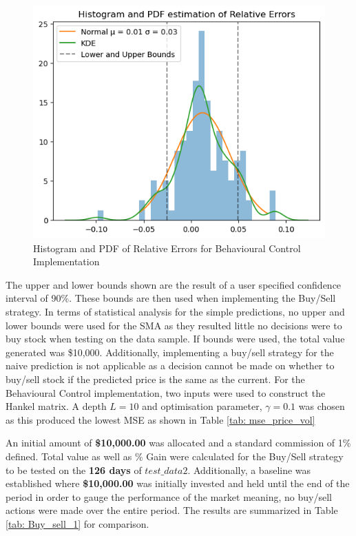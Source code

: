 \begin{figure}[h]
    \centering
    \includegraphics[width=0.8\columnwidth]{Results/Buy_sell/Behave_hist.png}
    \caption{Histogram and PDF of Relative Errors for Behavioural Control Implementation}
    \label{fig: behave_hist}
\end{figure}

\noindent The upper and lower bounds shown are the result of a user specified confidence interval of 90\%. These bounds are then used when implementing the Buy/Sell strategy. In terms of statistical analysis for the simple predictions, no upper and lower bounds were used for the SMA as they resulted little no decisions were to buy stock when testing on the data sample. If bounds were used, the total value generated was \$10,000. Additionally, implementing a buy/sell strategy for the naive prediction is not applicable as a decision cannot be made on whether to buy/sell stock if the predicted price is the same as the current. For the Behavioural Control implementation, two inputs were used to construct the Hankel matrix. A depth $L=10$ and optimisation parameter, $\gamma=0.1$ was chosen as this produced the lowest MSE as shown in Table \ref{tab: mse_price_vol} 

\noindent An initial amount of \textbf{\$10,000.00} was allocated and a standard commission of 1\% defined. Total value as well as \% Gain were calculated for the Buy/Sell strategy to be tested on the \textbf{126 days} of $test\_data2$. Additionally, a baseline was established where \textbf{\$10,000.00} was initially invested and held until the end of the period in order to gauge the performance of the market meaning, no buy/sell actions were made over the entire period. The results are summarized in Table \ref{tab: Buy_sell_1} for comparison.

